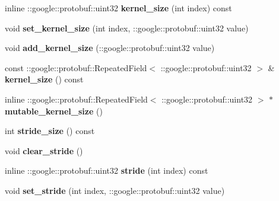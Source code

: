\begin{DoxyCompactItemize}
inline \+::google\+::protobuf\+::uint32 {\bfseries kernel\+\_\+size} (int index) const
\item 
\mbox{\label{classcaffe_1_1_convolution_parameter_a88956e7c89eb71b5a2f3a778f7428387}} 
void {\bfseries set\+\_\+kernel\+\_\+size} (int index, \+::google\+::protobuf\+::uint32 value)
\item 
\mbox{\label{classcaffe_1_1_convolution_parameter_aaa98b98cdbc72345e22ddcdade4d247f}} 
void {\bfseries add\+\_\+kernel\+\_\+size} (\+::google\+::protobuf\+::uint32 value)
\item 
\mbox{\label{classcaffe_1_1_convolution_parameter_a14ac2e316c75d589006e24d5bf4fcc93}} 
const \+::google\+::protobuf\+::\+Repeated\+Field$<$ \+::google\+::protobuf\+::uint32 $>$ \& {\bfseries kernel\+\_\+size} () const
\item 
\mbox{\label{classcaffe_1_1_convolution_parameter_a0b268f1c0926a5a3bf8c425f1a3fde31}} 
inline \+::google\+::protobuf\+::\+Repeated\+Field$<$ \+::google\+::protobuf\+::uint32 $>$ $\ast$ {\bfseries mutable\+\_\+kernel\+\_\+size} ()
\item 
\mbox{\label{classcaffe_1_1_convolution_parameter_ab343d5bbc6a10234e9ef545b31d10703}} 
int {\bfseries stride\+\_\+size} () const
\item 
\mbox{\label{classcaffe_1_1_convolution_parameter_a2ba50838c78b0de04c1afdf2916fd13d}} 
void {\bfseries clear\+\_\+stride} ()
\item 
\mbox{\label{classcaffe_1_1_convolution_parameter_ab4e5e42e7dd0d51f78dd7753123091cb}} 
inline \+::google\+::protobuf\+::uint32 {\bfseries stride} (int index) const
\item 
\mbox{\label{classcaffe_1_1_convolution_parameter_ac97ec932914584008fc3e2151c0b2da4}} 
void {\bfseries set\+\_\+stride} (int index, \+::google\+::protobuf\+::uint32 value)
\item 
\mbox{\label{classcaffe_1_1_convolution_parameter_ab772fed0e634d2b8da7d05acc2cd0473}} 

\end{DoxyCompactItemize}
